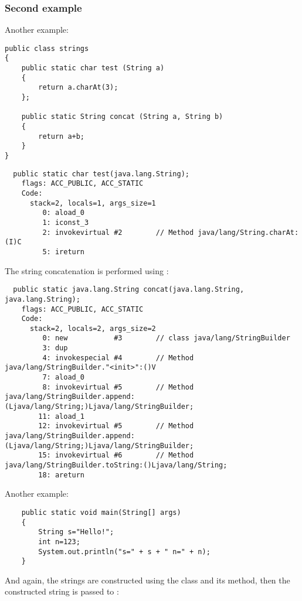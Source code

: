 \subsubsection{Second example}

Another example:

\begin{lstlisting}
public class strings
{
	public static char test (String a)
	{
		return a.charAt(3);
	};

	public static String concat (String a, String b)
	{
		return a+b;
	}
}
\end{lstlisting}

\begin{lstlisting}
  public static char test(java.lang.String);
    flags: ACC_PUBLIC, ACC_STATIC
    Code:
      stack=2, locals=1, args_size=1
         0: aload_0       
         1: iconst_3      
         2: invokevirtual #2        // Method java/lang/String.charAt:(I)C
         5: ireturn       
\end{lstlisting}
         
The string concatenation is performed using :


\begin{lstlisting}
  public static java.lang.String concat(java.lang.String, java.lang.String);
    flags: ACC_PUBLIC, ACC_STATIC
    Code:
      stack=2, locals=2, args_size=2
         0: new           #3        // class java/lang/StringBuilder
         3: dup           
         4: invokespecial #4        // Method java/lang/StringBuilder."<init>":()V
         7: aload_0       
         8: invokevirtual #5        // Method java/lang/StringBuilder.append:(Ljava/lang/String;)Ljava/lang/StringBuilder;
        11: aload_1       
        12: invokevirtual #5        // Method java/lang/StringBuilder.append:(Ljava/lang/String;)Ljava/lang/StringBuilder;
        15: invokevirtual #6        // Method java/lang/StringBuilder.toString:()Ljava/lang/String;
        18: areturn       
\end{lstlisting}

Another example:

\begin{lstlisting}
	public static void main(String[] args)
	{
		String s="Hello!";
		int n=123;
		System.out.println("s=" + s + " n=" + n);
	}
\end{lstlisting}

And again, the strings are constructed using the  class and its  method,
then the constructed string is passed to :



